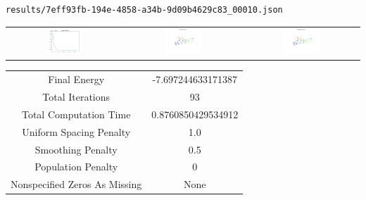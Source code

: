 \documentclass{report}
\begin{document}
\begin{lstlisting}
results/7eff93fb-194e-4858-a34b-9d09b4629c83_00010.json
\end{lstlisting}
\begin{tabular}{ccc}
\includegraphics[width=0.32\textwidth]{7eff93fb-194e-4858-a34b-9d09b4629c83_00010_energies.png}
&
\includegraphics[width=0.32\textwidth]{7eff93fb-194e-4858-a34b-9d09b4629c83_00010_initial_curves.png}
&
\includegraphics[width=0.32\textwidth]{7eff93fb-194e-4858-a34b-9d09b4629c83_00010_estimated_curves.png}
\\
\end{tabular}
\begin{tabular}{cc}
Final Energy&-7.697244633171387\\
Total Iterations&93\\
Total Computation Time&0.8760850429534912\\
Uniform Spacing Penalty&1.0\\
Smoothing Penalty&0.5\\
Population Penalty&0\\
Nonspecified Zeros As Missing&None\\
\end{tabular}
\end{document}
